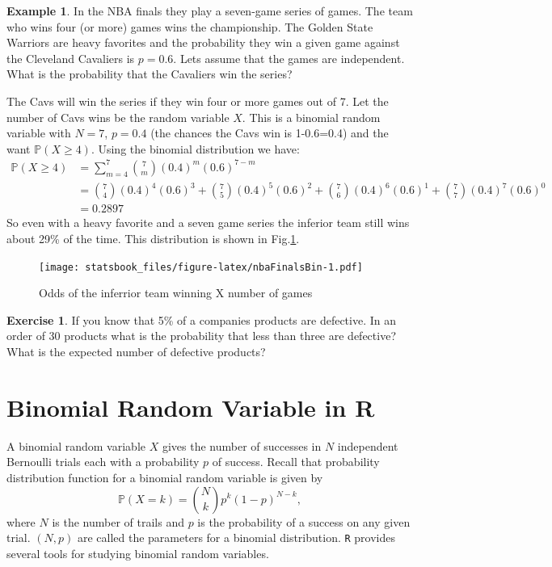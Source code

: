 \documentclass[
]{book}
\newcommand{\prob}[1]{{\mathbb{P}(#1)}}
\theoremstyle{definition}
\theoremstyle{definition}
\newtheorem{example}{Example}[chapter]
\theoremstyle{definition}
\newtheorem{exercise}{Exercise}[chapter]
\theoremstyle{definition}
\theoremstyle{remark}
\begin{document}
\begin{example}
\protect\hypertarget{exm:unnamed-chunk-279}{}\label{exm:unnamed-chunk-279}In the NBA finals they play a seven-game series of games. The team who wins four (or more) games wins the championship. The Golden State Warriors are heavy favorites and the probability they win a given game against the Cleveland Cavaliers is \(p=0.6\). Lets assume that the games are independent. What is the probability that the Cavaliers win the series?

The Cavs will win the series if they win four or more games out of 7. Let the number of Cavs wins be the random variable \(X\). This is a binomial random variable with \(N=7\), \(p=0.4\) (the chances the Cavs win is 1-0.6=0.4) and the want \(\prob{X \geq 4}\). Using the binomial distribution we have:
\[
\begin{aligned}
\prob{X \geq 4} &= \sum_{m=4}^7 \binom{7}{m} (0.4)^m (0.6)^{7-m} \\
&= \binom{7}{4} (0.4)^{4} (0.6)^{3}+\binom{7}{5} (0.4)^{5} (0.6)^{2}+\binom{7}{6} (0.4)^{6} (0.6)^{1}+\binom{7}{7} (0.4)^{7} (0.6)^{0}  \\
&=0.2897
\end{aligned}
\]
So even with a heavy favorite and a seven game series the inferior team still wins about 29\% of the time. This distribution is shown in Fig.\ref{fig:nbaFinalsBin}.
\end{example}

\begin{figure}
\centering
\texttt{[image: statsbook\_files/figure-latex/nbaFinalsBin-1.pdf]}
\caption{\label{fig:nbaFinalsBin}Odds of the inferrior team winning X number of games}
\end{figure}

\begin{exercise}
\protect\hypertarget{exr:unnamed-chunk-280}{}\label{exr:unnamed-chunk-280}If you know that 5\% of a companies products are defective. In an order of 30 products what is the probability that less than three are defective? What is the expected number of defective products?
\end{exercise}

\hypertarget{binomial-random-variable-in-r}{%
\section{Binomial Random Variable in R}\label{binomial-random-variable-in-r}}

A binomial random variable \(X\) gives the number of successes in \(N\) independent Bernoulli trials each with a probability \(p\) of success. Recall that probability distribution function for a binomial random variable is given by \[\mathbb{P}(X=k)=\binom{N}{k} p^k (1-p)^{N-k},\] where \(N\) is the number of trails and \(p\) is the probability of a success on any given trial. \((N,p)\) are called the parameters for a binomial distribution. \texttt{R} provides several tools for studying binomial random variables.
\end{document}
